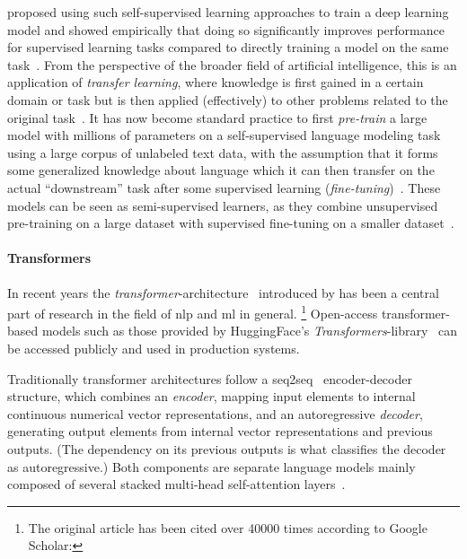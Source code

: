 \citeauthor*{self_supervised_seq2seq} proposed using such self-supervised learning approaches to train a
deep learning model and showed empirically that doing so significantly improves performance for supervised learning tasks
compared to directly training a model on the same task~\parencite{self_supervised_seq2seq}.
From the perspective of the broader field of artificial intelligence,
this is an application of \emph{transfer learning},
where knowledge is first gained in a certain domain or task but is then applied (effectively) to other problems related to the original task~\parencite[26]{practical_nlp}.
It has now become standard practice to first \emph{pre-train} a large model with millions of parameters
on a self-supervised language modeling task using a large corpus of unlabeled text data,
with the assumption that it forms some generalized knowledge about language which it can
then transfer on the actual \enquote{downstream} task after some supervised learning
(\emph{fine-tuning})~\parencites{bert}{bart}{pegasus}.
These models can be seen as semi-supervised learners,
as they combine unsupervised pre-training on a large dataset with supervised fine-tuning on a smaller dataset~\parencites[16]{practical_nlp}{self_supervised_seq2seq}.

\paragraph{Transformers}

In recent years the \emph{transformer}-architecture~\parencite{transformer}
introduced by \citeauthor*{transformer} has been a central part of research
in the field of \ac{nlp} and \acl{ml} in general.%
\footnote{The original article has been cited over 40000 times according to Google Scholar:
}
Open-access transformer-based models such as those provided by HuggingFace's \emph{Transformers}-library~\parencite{huggingface_transformers}
can be accessed publicly and used in production systems.

Traditionally transformer architectures follow
a \ac{seq2seq}~\parencite{seq2seq} encoder-decoder structure,
which combines an \emph{encoder},
mapping input elements to internal continuous numerical vector representations,
and an autoregressive \emph{decoder},
generating output elements from internal vector representations and previous outputs.
(The dependency on its previous outputs is what classifies the decoder as autoregressive.)
Both components are separate language models mainly composed of
several stacked multi-head self-attention layers~\parencite[2-3]{transformer}.

